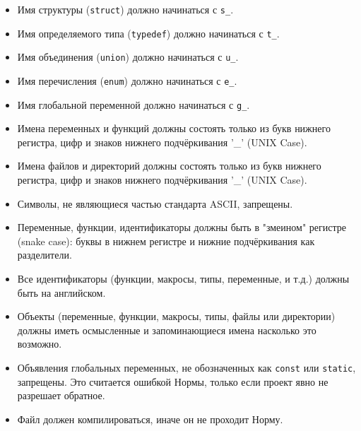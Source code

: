 \documentclass{42-ru}
\begin{document}
        \begin{itemize}

            \item Имя структуры (\texttt{struct}) должно начинаться с \texttt{s\_}.

            \item Имя определяемого типа (\texttt{typedef}) должно начинаться с \texttt{t\_}.

            \item Имя объединения (\texttt{union}) должно начинаться с \texttt{u\_}.

            \item Имя перечисления (\texttt{enum}) должно начинаться с \texttt{e\_}.

            \item Имя глобальной переменной должно начинаться с \texttt{g\_}.

            \item Имена переменных и функций должны состоять только из букв нижнего регистра, цифр и знаков нижнего подчёркивания '\_' (UNIX Case).

            \item Имена файлов и директорий должны состоять только из букв нижнего регистра, цифр и знаков нижнего подчёркивания '\_' (UNIX Case).

            \item Символы, не являющиеся частью стандарта ASCII, запрещены.

            \item Переменные, функции, идентификаторы должны быть в "змеином" регистре (snake case): буквы в нижнем регистре и нижние подчёркивания как разделители.

            \item Все идентификаторы (функции, макросы, типы, переменные, и т.д.) должны быть на английском.

            \item Объекты (переменные, функции, макросы, типы, файлы или директории) должны иметь осмысленные и запоминающиеся имена насколько это возможно.

            \item Объявления глобальных переменных, не обозначенных как \texttt{const} или \texttt{static}, запрещены. Это считается ошибкой Нормы, только если проект явно не разрешает обратное.

            \item Файл должен компилироваться, иначе он не проходит Норму.

        \end{itemize}
\end{document}
